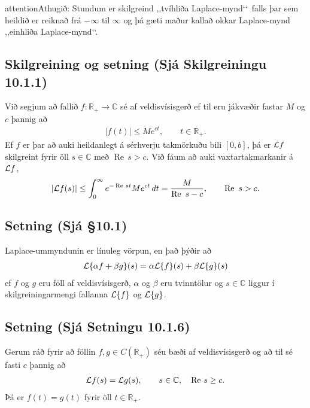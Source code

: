 \documentclass[a4paper,10pt,icelandic]{sphinxmanual}
\begin{document}
\begin{sphinxadmonition}{attention}{Athugið:}
Stundum er skilgreind ,,tvíhliða Laplace-mynd‘‘ falls þar sem heildið er reiknað frá \(-\infty\) til \(\infty\) og þá gæti maður kallað okkar Laplace-mynd ,,einhliða Laplace-mynd‘‘.
\end{sphinxadmonition}


\subsection{Skilgreining og setning  (Sjá Skilgreiningu 10.1.1)}
\label{\detokenize{Kafli10:skilgreining-og-setning-sja-skilgreiningu-10-1-1}}
Við segjum að fallið \(f:\mathbb{R}_+\to {\mathbb{C}}\) sé af veldisvísisgerð ef til eru jákvæðir fastar \(M\) og \(c\) þannig að
\begin{equation*}
\begin{split}|f(t)|\leq Me^{c t}, \qquad t\in \mathbb{R}_+.\label{7.1.2}\end{split}
\end{equation*}
Ef \(f\) er þar að auki heildanlegt á sérhverju takmörkuðu bili \([0,b]\), þá er \({\cal L} f\) skilgreint fyrir öll \(s\in {\mathbb{C}}\) með \(\operatorname{Re\, } s>c\). Við fáum að auki vaxtartakmarkanir á \({\cal L} f\),
\begin{equation*}
\begin{split}|{\cal L} f(s) |\leq
\int_0^\infty e^{-\operatorname{Re\, } st} Me^{c t} \, dt =
\dfrac M{\operatorname{Re\, }\,  s-c}, \qquad \operatorname{Re\, }\,  s>c.\end{split}
\end{equation*}

\subsection{Setning (Sjá \S{}10.1)}
\label{\detokenize{Kafli10:setning-sja-10-1}}
Laplace-ummyndunin er línuleg vörpun, en það þýðir að
\begin{equation*}
\begin{split}{\cal L}\{\alpha f+\beta g\}(s)=\alpha{\cal L}\{f\}(s)+\beta{\cal L}\{g\}(s)\end{split}
\end{equation*}
ef \(f\) og \(g\) eru föll af veldisvísisgerð, \(\alpha\) og \(\beta\) eru tvinntölur og \(s\in {\mathbb{C}}\) liggur í skilgreiningarmengi fallanna \({\cal L}\{f\}\) og \({\cal L}\{g\}\).


\subsection{Setning (Sjá Setningu 10.1.6)}
\label{\detokenize{Kafli10:setning-sja-setningu-10-1-6}}
Gerum ráð fyrir að föllin \(f,g\in C(\mathbb{R}_+)\) séu bæði af veldisvísisgerð og að til sé fasti \(c\) þannig að
\begin{equation*}
\begin{split}{\cal L} f(s)={\cal L} g(s), \qquad s\in {\mathbb{C}}, \quad \operatorname{Re\, } s\geq c.\end{split}
\end{equation*}
Þá er \(f(t)=g(t)\) fyrir öll \(t\in \mathbb{R}_+\).
\end{document}
